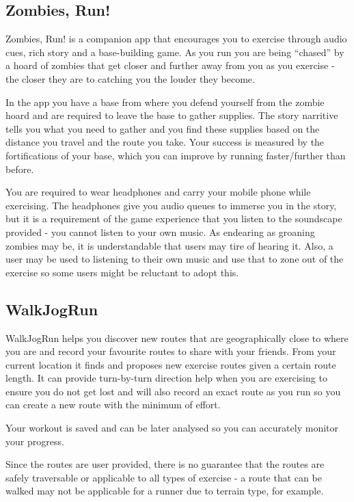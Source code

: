 \subsection{Zombies, Run!}
\label{sec:zombies}
Zombies, Run! is a companion app that encourages you to exercise through
audio cues, rich story and a base-building game. As you run you are
being ``chased'' by a hoard of zombies that get closer and further
away from you as you exercise - the closer they are to catching you
the louder they become. 

In the app you have a base from where you defend yourself from the
zombie hoard and are required to leave the base to gather
supplies. The story narritive tells you what you need to gather and
you find these supplies based on the distance you travel and the route
you take. Your success is measured by the fortifications of your base,
which you can improve by running faster/further than before.

You are required to wear headphones and carry your mobile phone while
exercising. The headphones give you audio queues to immerse you in the
story, but it is a requirement of the game experience that you listen
to the soundscape provided - you cannot listen to your own music. As
endearing as groaning zombies may be, it is understandable that users
may tire of hearing it. Also, a user may be used to listening to their
own music and use that to zone out of the exercise so some users might
be reluctant to adopt this.


\subsection{WalkJogRun}
\label{sec:walkjogrun}
WalkJogRun helps you discover new routes that are geographically
close to where you are and record your favourite routes to share with
your friends. From your current location it finds and
proposes new exercise routes given a certain route length. It can
provide turn-by-turn direction help when you are exercising to ensure
you do not get lost and will also record an exact route as you run so
you can create a new route with the minimum of effort. 

Your workout is saved and can be later analysed so you can accurately
monitor your progress.

Since the routes are user provided, there is no guarantee that the
routes are safely traversable or applicable to all types of exercise -
a route that can be walked may not be applicable for a runner due to
terrain type, for example. 

